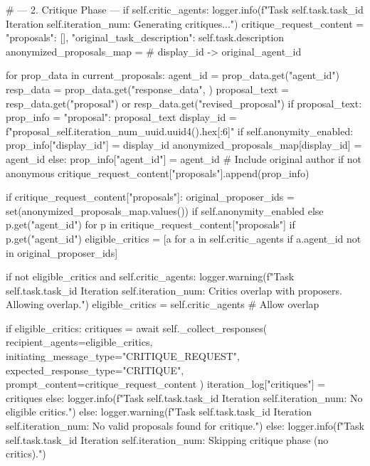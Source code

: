 \documentclass{amsbook}
\theoremstyle{definition}
\theoremstyle{remark}
\numberwithin{equation}{chapter} %
\begin{document}
\begin{python}
                # --- 2. Critique Phase ---
                if self.critic_agents:
                    logger.info(f"Task {self.task.task_id} Iteration {self.iteration_num}: Generating critiques...")
                    critique_request_content = {"proposals": [], "original_task_description": self.task.description}
                    anonymized_proposals_map = {} # display_id -> original_agent_id

                    for prop_data in current_proposals:
                         agent_id = prop_data.get("agent_id")
                         resp_data = prop_data.get("response_data", {})
                         proposal_text = resp_data.get("proposal") or resp_data.get("revised_proposal")
                         if proposal_text:
                              prop_info = {"proposal": proposal_text}
                              display_id = f"proposal_{self.iteration_num}_{uuid.uuid4().hex[:6]}"
                              if self.anonymity_enabled:
                                   prop_info["display_id"] = display_id
                                   anonymized_proposals_map[display_id] = agent_id
                              else:
                                   prop_info["agent_id"] = agent_id # Include original author if not anonymous
                              critique_request_content["proposals"].append(prop_info)

                    if critique_request_content["proposals"]:
                         original_proposer_ids = set(anonymized_proposals_map.values()) if self.anonymity_enabled else {p.get("agent_id") for p in critique_request_content["proposals"] if p.get("agent_id")}
                         eligible_critics = [a for a in self.critic_agents if a.agent_id not in original_proposer_ids]

                         if not eligible_critics and self.critic_agents:
                              logger.warning(f"Task {self.task.task_id} Iteration {self.iteration_num}: Critics overlap with proposers. Allowing overlap.")
                              eligible_critics = self.critic_agents # Allow overlap

                         if eligible_critics:
                              critiques = await self._collect_responses(
                                  recipient_agents=eligible_critics,
                                  initiating_message_type="CRITIQUE_REQUEST",
                                  expected_response_type="CRITIQUE",
                                  prompt_content=critique_request_content
                              )
                              iteration_log["critiques"] = critiques
                         else: logger.info(f"Task {self.task.task_id} Iteration {self.iteration_num}: No eligible critics.")
                    else: logger.warning(f"Task {self.task.task_id} Iteration {self.iteration_num}: No valid proposals found for critique.")
                else: logger.info(f"Task {self.task.task_id} Iteration {self.iteration_num}: Skipping critique phase (no critics).")


\end{python}
\end{document}
